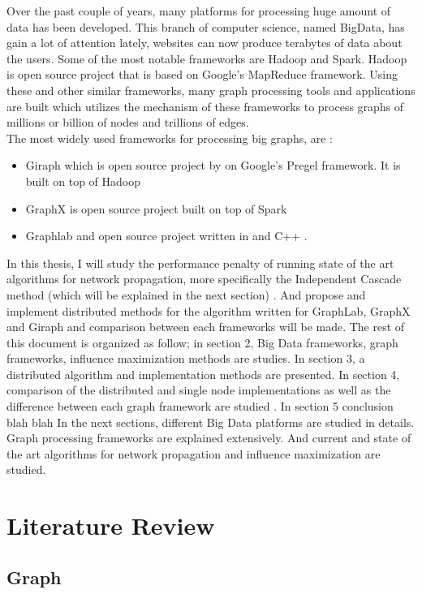 \documentclass[english]{tktltiki}
\begin{document}
Over the past couple of years, many platforms for processing huge amount of data has been developed. This branch of computer science, named BigData, has gain a lot of attention lately, websites can now produce terabytes of data about the users. 
Some of the most notable frameworks are Hadoop and Spark. Hadoop is open source project that is based on Google's MapReduce framework. 
Using these and other similar frameworks, many graph processing tools and applications are built which utilizes the mechanism of these frameworks to process graphs of millions or billion of nodes and trillions of edges. \\
The most widely used frameworks for processing big graphs, are :
\begin{itemize}
\item 
Giraph which is open source project by on Google's Pregel framework. It is built on top of Hadoop
\item 
GraphX is open source project built on top of Spark
\item
Graphlab and open source project written in  and C++ . 
\end{itemize}
In this thesis, I will study the performance penalty of running state of the art algorithms for network propagation, more specifically the Independent Cascade method (which will be explained in the next section) . And propose and implement distributed methods for the algorithm written for GraphLab, GraphX and Giraph and comparison between each frameworks will be made. 
The rest of this document is organized as follow; in section 2, Big Data frameworks, graph frameworks, influence maximization methods are studies. In section 3, a distributed algorithm and implementation methods are presented. In section 4, comparison of the distributed and single node implementations as well as the difference between each graph framework are studied . In section 5 conclusion blah blah
In the next sections, different Big Data platforms are studied in details. Graph processing frameworks are explained extensively. And current and state of the art algorithms for network propagation and influence maximization are studied. 




\section{Literature Review}



\subsection{Graph}
\end{document}
